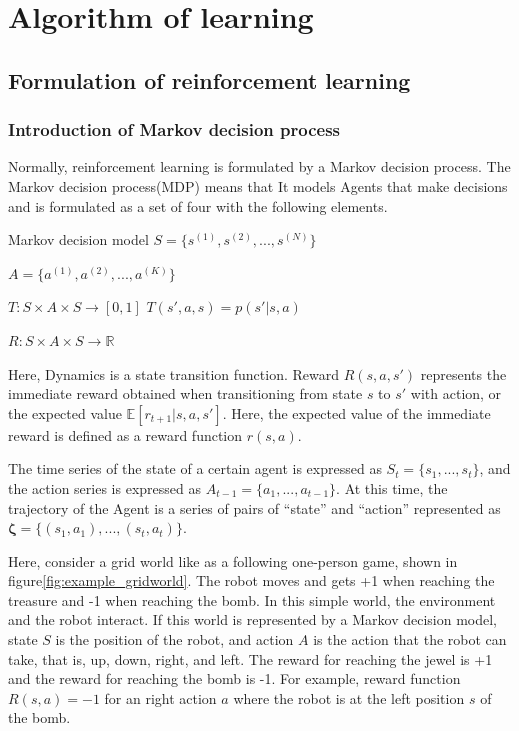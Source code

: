 \pagebreak
\chapter{Algorithm of learning}
\label{chapter:Algorithm}



\section{Formulation of reinforcement learning}

\subsection{Introduction of Markov decision process}

Normally, reinforcement learning is formulated by a Markov decision process. The Markov decision process(MDP) means that
It models Agents that make decisions and is formulated as a set of four with the following elements.
\begin{itembox}[l]{Markov decision model}
 \hspace{1.2cm} $S = \{ s^{(1)}, s^{(2)}, ... , s^{(N)} \}$

 \hspace{1cm} $A = \{ a^{(1)}, a^{(2)}, ... , a^{(K)} \}$ 

 \hspace{5mm} $T : S \times A \times S \rightarrow [0, 1]$ \hspace{1cm} $T(s',a,s) = p(s' | s,a)$

 \hspace{0.9cm} $R : S \times A \times S \rightarrow \mathbb{R}$
\end{itembox}

Here, Dynamics is a state transition function.
Reward $R(s, a, s')$ represents the immediate reward obtained when transitioning from state $s$ to $s′$ with action, or the expected value $\mathbb{E}[r_{t+1}|s,a,s']$.
Here, the expected value of the immediate reward is defined as a reward function $r(s, a)$.

The time series of the state of a certain agent is expressed as $S_t = \{s_1, ... , s_t \}$, and the action series is expressed as $A_{t-1} = \{ a_1, ..., a_{t-1} \}$.
At this time, the trajectory of the Agent is a series of pairs of “state” and “action” represented as $\bm{\zeta} = \{ (s_1, a_1), ... , (s_t, a_t) \}$.

Here, consider a grid world like as a following one-person game,  shown in figure\ref{fig:example_gridworld}. The robot moves and gets +1 when reaching the treasure and -1 when reaching the bomb.
In this simple world, the environment and the robot interact. If this world is represented by a Markov decision model, state $S$ is the position of the robot, and action $A$ is the action that the robot can take, that is, up, down, right, and left.
The reward for reaching the jewel is +1 and the reward for reaching the bomb is -1.
For example, reward function $R(s, a) = -1$ for an right action $a$  where the robot is at the left position $s$ of the bomb.


